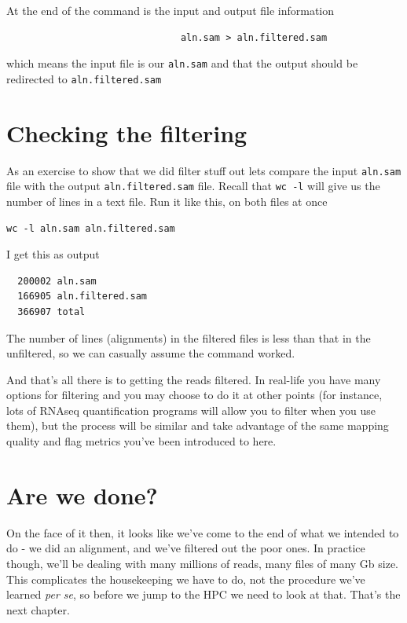 \documentclass[]{book}
\begin{document}
At the end of the command is the input and output file information

\begin{verbatim}
                               aln.sam > aln.filtered.sam
\end{verbatim}

which means the input file is our \texttt{aln.sam} and that the output should be redirected to \texttt{aln.filtered.sam}

\hypertarget{checking-the-filtering}{%
\section{Checking the filtering}\label{checking-the-filtering}}

As an exercise to show that we did filter stuff out lets compare the input \texttt{aln.sam} file with the output \texttt{aln.filtered.sam} file. Recall that \texttt{wc\ -l} will give us the number of lines in a text file. Run it like this, on both files at once

\begin{verbatim}
wc -l aln.sam aln.filtered.sam
\end{verbatim}

I get this as output

\begin{verbatim}
  200002 aln.sam
  166905 aln.filtered.sam
  366907 total
\end{verbatim}

The number of lines (alignments) in the filtered files is less than that in the unfiltered, so we can casually assume the command worked.

And that's all there is to getting the reads filtered. In real-life you have many options for filtering and you may choose to do it at other points (for instance, lots of RNAseq quantification programs will allow you to filter when you use them), but the process will be similar and take advantage of the same mapping quality and flag metrics you've been introduced to here.

\hypertarget{are-we-done}{%
\section{Are we done?}\label{are-we-done}}

On the face of it then, it looks like we've come to the end of what we intended to do - we did an alignment, and we've filtered out the poor ones. In practice though, we'll be dealing with many millions of reads, many files of many Gb size. This complicates the housekeeping we have to do, not the procedure we've learned \emph{per se}, so before we jump to the HPC we need to look at that. That's the next chapter.
\end{document}
